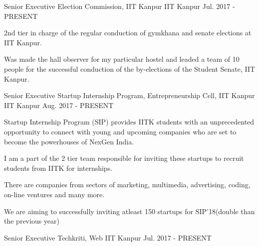 \begin{cventries}
  \cventry
    {Senior Executive}
    {Election Commission, IIT Kanpur}
    {IIT Kanpur}
    {Jul. 2017 - PRESENT}
    {
      \begin{cvitems}
        \item {2nd tier in charge of the regular conduction of gymkhana and senate elections at IIT Kanpur.}
        \item {Was made the hall observer for my particular hostel and leaded a team of 10 people for the successful conduction of the by-elections of the Student Senate, IIT Kanpur.}
      \end{cvitems}
    }
  \cventry
    {Senior Executive}
    {Startup Internship Program, Entrepreneurship Cell, IIT Kanpur}
    {IIT Kanpur}
    {Aug. 2017 - PRESENT}
    {
      \begin{cvitems}
        \item {Startup Internship Program (SIP) provides IITK students with an unprecedented opportunity to connect with young and upcoming companies who are set to become the powerhouses of NexGen India.}
        \item {I am a part of the 2 tier team responsible for inviting these startups to recruit students from IITK for internships. }
        \item {There are companies from sectors of marketing, multimedia, advertising, coding, on-line ventures and many more.}
        \item {We are aiming to successfully inviting atleast 150 startups for SIP'18(double than the previous year)}
      \end{cvitems}
    }
  \cventry
    {Senior Executive}
    {Techkriti, Web}
    {IIT Kanpur}
    {Jul. 2017 - PRESENT}
    {
    }
\end{cventries}
